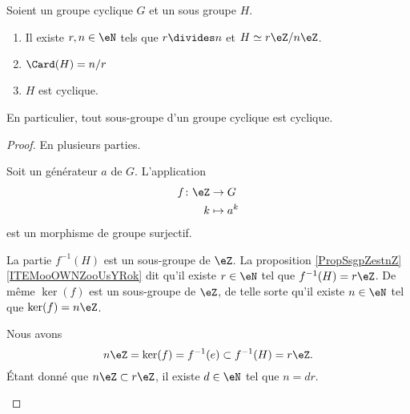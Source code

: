\begin{lemma}     \label{LEMooZJGVooRYrujB}
	Soient un groupe cyclique \( G\) et un sous groupe \( H\).
	\begin{enumerate}
		\item       \label{ITEMooUNOEooZoElYL}
		      Il existe \( r,n\in\eN\) tels que \( r\divides n\) et \( H\simeq r\eZ/n\eZ\).
		\item       \label{ITEMooMUSSooBmNXEd}
		      \( \Card(H)=n/r\)
		\item       \label{ITEMooVPEKooKdPibk}
		      \( H\) est cyclique.
	\end{enumerate}
	En particulier, tout sous-groupe d'un groupe cyclique est cyclique.
\end{lemma}

\begin{proof}
	En plusieurs parties.
	\begin{subproof}
		Soit un générateur \( a\) de \( G\). L'application
		\begin{equation}
			\begin{aligned}
				f\colon \eZ & \to G       \\
				k           & \mapsto a^k
			\end{aligned}
		\end{equation}
		est un morphisme de groupe surjectif.

		La partie \( f^{-1}(H)\) est un sous-groupe de \( \eZ\). La proposition \ref{PropSsgpZestnZ}\ref{ITEMooOWNZooUsYRok} dit qu'il existe \( r\in \eN\) tel que \( f^{-1}(H)=r\eZ\). De même \( \ker(f)\) est un sous-groupe de \( \eZ\), de telle sorte qu'il existe \( n\in \eN\) tel que \( \ker(f)=n\eZ\).

		Nous avons
		\begin{equation}
			n\eZ=\ker(f)=f^{-1}(e)\subset f^{-1}(H)=r\eZ.
		\end{equation}
		Étant donné que \( n\eZ\subset r\eZ\), il existe \( d\in \eN\) tel que \( n=dr\).


\end{subproof}
\end{proof}
